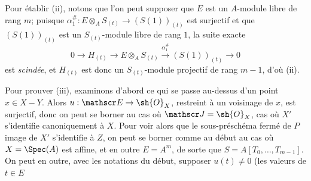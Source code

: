 Pour établir (ii), notons que l'on peut supposer que $E$ est un $A$-module libre de rang $m$; puisque $\alpha_1^{\#}:E\otimes_A S_{(t)}\to(S(1))_{(t)}$ est surjectif et que $(S(1))_{(t)}$ est un $S_{(t)}$-module libre de rang $1$, la suite exacte
\[
  0\longrightarrow H_{(t)}\longrightarrow E\otimes_A S_{(t)}\xrightarrow{\alpha_1^{\#}}(S(1))_{(t)}\longrightarrow0
\]
est \emph{scindée}, et $H_{(t)}$ est donc un $S_{(t)}$-module projectif de rang $m-1$, d'où (ii).

Pour prouver (iii), examinons d'abord ce qui se passe au-dessus d'un point $x\in X-Y$. Alors $u:\mathscr E\to\sh{O}_X$, restreint à un voisinage de $x$, est surjectif, donc on peut se borner au cas où $\mathscr J=\sh{O}_X$, cas où $X'$ s'identifie canoniquement à $X$. Pour voir alors que le sous-préschéma fermé de $P$ image de $X'$ s'identifie à $Z$, on peut se borner comme au début au cas où $X=\Spec(A)$ est affine, et en outre $E=A^m$, de sorte que $S=A[T_0,\ldots,T_{m-1}]$. On peut en outre, avec les notations du début, supposer $u(t)\ne0$ (les valeurs de $t\in E$

